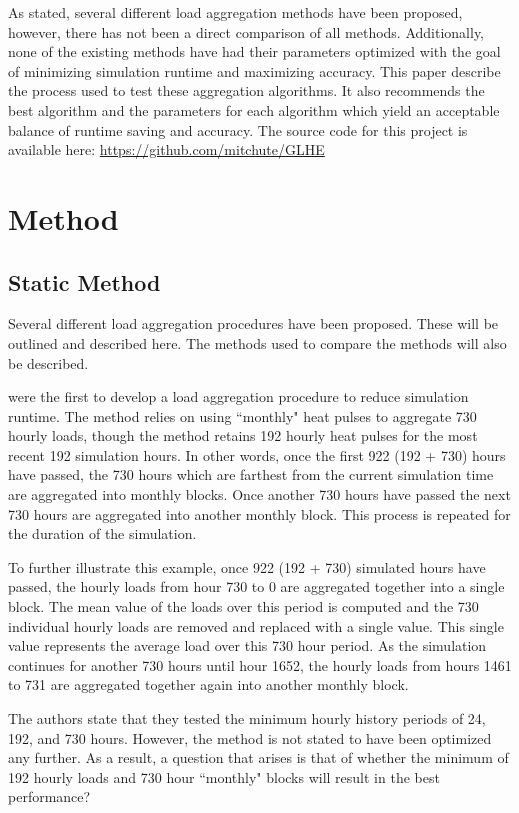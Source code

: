 \documentclass[review,12pt]{elsarticle}
\begin{document}
As stated, several different load aggregation methods have been proposed, however, there has not been a direct comparison of all methods. Additionally, none of the existing methods have had their parameters optimized with the goal of minimizing simulation runtime and maximizing accuracy. This paper describe the process used to test these aggregation algorithms. It also recommends the best algorithm and the parameters for each algorithm which yield an acceptable balance of runtime saving and accuracy. The source code for this project is available here: \url{https://github.com/mitchute/GLHE}

\section*{Method}

\subsection*{Static Method}

Several different load aggregation procedures have been proposed. These will be outlined and described here. The methods used to compare the methods will also be described.

\cite{YavuzturkSpitler1999} were the first to develop a load aggregation procedure to reduce simulation runtime. The method relies on using ``monthly" heat pulses to aggregate 730 hourly loads, though the method retains 192 hourly heat pulses for the most recent 192 simulation hours. In other words, once the first 922 (192 + 730) hours have passed, the 730 hours which are farthest from the current simulation time are aggregated into monthly blocks. Once another 730 hours have passed the next 730 hours are aggregated into another monthly block. This process is repeated for the duration of the simulation.

To further illustrate this example, once 922 (192 + 730) simulated hours have passed, the hourly loads from hour 730 to 0 are aggregated together into a single block. The mean value of the loads over this period is computed and the 730 individual hourly loads are removed and replaced with a single value. This single value represents the average load over this 730 hour period. As the simulation continues for another 730 hours until hour 1652, the hourly loads from hours 1461 to 731 are aggregated together again into another monthly block.

The authors state that they tested the minimum hourly history periods of 24, 192, and 730 hours. However, the method is not stated to have been optimized any further. As a result, a question that arises is that of whether the minimum of 192 hourly loads and 730 hour ``monthly" blocks will result in the best performance?
\end{document}
